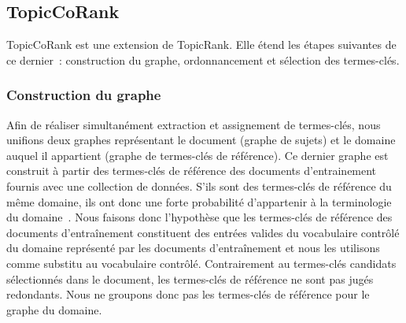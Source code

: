     \subsection{TopicCoRank}
    \label{subsec:main-automatic_keyphrase_annotation-supervised_automatic_keyphrase_annotation-topiccorank}
      TopicCoRank est une extension de TopicRank. Elle étend les étapes
      suivantes de ce dernier~: construction du graphe, ordonnancement et
      sélection des termes-clés.

      \subsubsection{Construction du graphe}
      \label{subsubsec:main-automatic_keyphrase_annotation-supervised_automatic_keyphrase_extraction-topiccorank-graph_construction}
        Afin de réaliser simultanément extraction et assignement de termes-clés,
        nous unifions deux graphes représentant le document (graphe de sujets)
        et le domaine auquel il appartient (graphe de termes-clés de référence).
        Ce dernier graphe est construit à partir des termes-clés de référence
        des documents d'entrainement fournis avec une collection de données.
        S'ils sont des termes-clés de référence du même domaine, ils ont donc
        une forte probabilité d'appartenir à la terminologie du
        domaine~\cite{chaimongkol2013technicaltermextraction}. Nous faisons donc
        l'hypothèse que les termes-clés de référence des documents
        d'entraînement constituent des entrées valides du vocabulaire contrôlé
        du domaine représenté par les documents d'entraînement et nous les
        utilisons comme substitu au vocabulaire contrôlé. Contrairement au
        termes-clés candidats sélectionnés dans le document, les termes-clés de
        référence ne sont pas jugés redondants. Nous ne groupons donc pas les
        termes-clés de référence pour le graphe du domaine.

